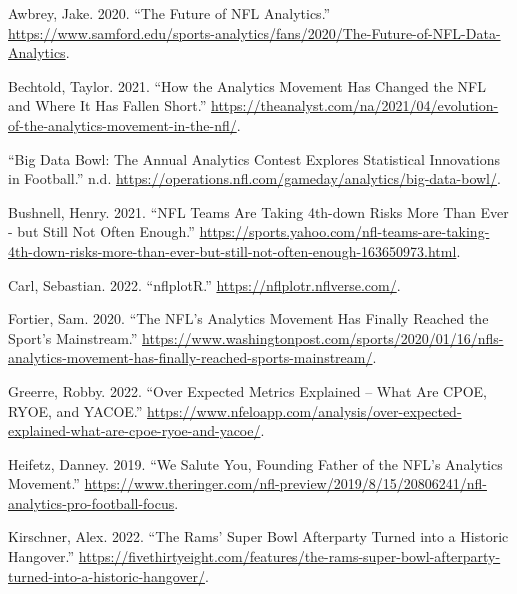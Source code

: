 \documentclass[
  letterpaper,
]{krantz}
\newlength{\cslhangindent}
\newlength{\cslentryspacingunit} %
\newenvironment{CSLReferences}[2] %
 {%
  \setlength{\parindent}{0pt}
  \ifodd #1
  \let\oldpar\par
  \def\par{\hangindent=\cslhangindent\oldpar}
  \fi
  \setlength{\parskip}{#2\cslentryspacingunit}
 }%
 {}
\begin{document}

\hypertarget{refs}{}
\begin{CSLReferences}{1}{0}
\leavevmode{}%
Awbrey, Jake. 2020. {``The Future of NFL Analytics.''}
\url{https://www.samford.edu/sports-analytics/fans/2020/The-Future-of-NFL-Data-Analytics}.

\leavevmode{}%
Bechtold, Taylor. 2021. {``How the Analytics Movement Has Changed the
NFL and Where It Has Fallen Short.''}
\url{https://theanalyst.com/na/2021/04/evolution-of-the-analytics-movement-in-the-nfl/}.

\leavevmode{}%
{``Big Data Bowl: The Annual Analytics Contest Explores Statistical
Innovations in Football.''} n.d.
\url{https://operations.nfl.com/gameday/analytics/big-data-bowl/}.

\leavevmode{}%
Bushnell, Henry. 2021. {``NFL Teams Are Taking 4th-down Risks More Than
Ever - but Still Not Often Enough.''}
\url{https://sports.yahoo.com/nfl-teams-are-taking-4th-down-risks-more-than-ever-but-still-not-often-enough-163650973.html}.

\leavevmode{}%
Carl, Sebastian. 2022. {``nflplotR.''}
\url{https://nflplotr.nflverse.com/}.

\leavevmode{}%
Fortier, Sam. 2020. {``The NFL's Analytics Movement Has Finally Reached
the Sport's Mainstream.''}
\url{https://www.washingtonpost.com/sports/2020/01/16/nfls-analytics-movement-has-finally-reached-sports-mainstream/}.

\leavevmode{}%
Greerre, Robby. 2022. {``Over Expected Metrics Explained -- What Are
CPOE, RYOE, and YACOE.''}
\url{https://www.nfeloapp.com/analysis/over-expected-explained-what-are-cpoe-ryoe-and-yacoe/}.

\leavevmode{}%
Heifetz, Danney. 2019. {``We Salute You, Founding Father of the NFL's
Analytics Movement.''}
\url{https://www.theringer.com/nfl-preview/2019/8/15/20806241/nfl-analytics-pro-football-focus}.

\leavevmode{}%
Kirschner, Alex. 2022. {``The Rams' Super Bowl Afterparty Turned into a
Historic Hangover.''}
\url{https://fivethirtyeight.com/features/the-rams-super-bowl-afterparty-turned-into-a-historic-hangover/}.


\end{CSLReferences}
\end{document}
